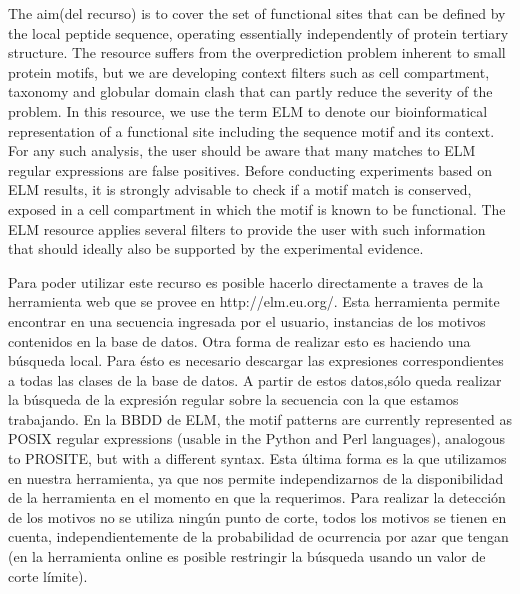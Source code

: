 The aim(del recurso) is to cover the set of functional sites that can be defined by the local peptide sequence, operating essentially independently of protein tertiary structure. 
The resource suffers from the overprediction problem inherent to small protein motifs, but we are developing context filters such as cell compartment, taxonomy and globular domain clash that can partly reduce the severity
of the problem. In this resource, we use the term ELM to denote our bioinformatical representation of a functional site including the sequence motif and its context.
For any such analysis, the user should be aware that many matches to ELM regular expressions are false positives. 
Before conducting experiments based on ELM results, it is strongly advisable to check if a motif match is conserved, exposed in a cell compartment in which the motif is known to be functional. 
The ELM resource applies several filters to provide the user with such information that should ideally also be supported by the experimental evidence.


Para poder utilizar este recurso es posible hacerlo directamente a traves de la herramienta web que se provee en http://elm.eu.org/. Esta herramienta permite encontrar en una secuencia ingresada por el usuario, instancias de los motivos contenidos en la base de datos.
Otra forma de realizar esto es haciendo una búsqueda local. Para ésto es necesario descargar las expresiones correspondientes a todas las clases de la base de datos. 
A partir de estos datos,sólo queda realizar la búsqueda de la expresión regular sobre la secuencia con la que estamos trabajando.
En la BBDD de ELM, the motif patterns are currently represented as POSIX regular expressions (usable in the Python and Perl languages), analogous to PROSITE, but with a different syntax.
Esta última forma es la que utilizamos en nuestra herramienta, ya que nos permite independizarnos de la disponibilidad de la herramienta en el momento en que la requerimos.
Para realizar la detección de los motivos no se utiliza ningún punto de corte, todos los motivos se tienen en cuenta, independientemente de la probabilidad de ocurrencia por azar que tengan (en la herramienta online es posible restringir la búsqueda usando un valor de corte límite).

